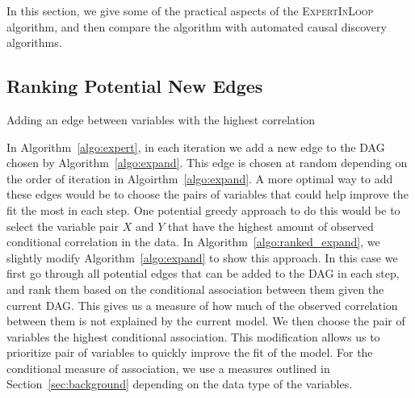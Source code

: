 \documentclass{uai2025} %
\begin{document}
In this section, we give some of the practical aspects of the
\textsc{ExpertInLoop} algorithm, and then compare the algorithm with automated
causal discovery algorithms.

\subsection{Ranking Potential New Edges}
\label{sec:ranking}


\begin{algorithm}[h]
\DontPrintSemicolon
\SetAlgoLined
{}
\caption{Adding an edge between variables with the highest correlation}
\label{algo:ranked_expand}
\end{algorithm}

In Algorithm~\ref{algo:expert}, in each iteration we add a new edge to the DAG
chosen by Algorithm~\ref{algo:expand}. This edge is chosen at random depending
on the order of iteration in Algoirthm~\ref{algo:expand}. A more optimal way to
add these edges would be to choose the pairs of variables that could help
improve the fit the most in each step. One potential greedy approach to do this
would be to select the variable pair $ X $ and $ Y $ that have the highest
amount of observed conditional correlation in the data. In
Algorithm~\ref{algo:ranked_expand}, we slightly modify
Algorithm~\ref{algo:expand} to show this approach. In this case we first go
through all potential edges that can be added to the DAG in each step, and rank
them based on the conditional association between them given the current DAG.
This gives us a measure of how much of the observed correlation between them is
not explained by the current model. We then choose the pair of variables the
highest conditional association. This modification allows us to prioritize pair
of variables to quickly improve the fit of the model. For the conditional
measure of association, we use a measures outlined in
Section~\ref{sec:background} depending on the data type of the variables.
\end{document}
